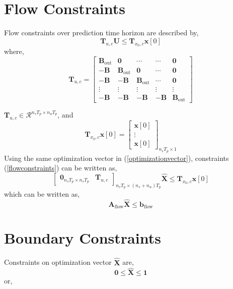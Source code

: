 \documentclass{article}
\begin{document}
\section{Flow Constraints}
Flow constraints over prediction time horizon are described by,
\begin{equation}
\label{flowconstraints}
\mathbf{T}_{u,c} \mathbf{U} \leq \mathbf{T}_{x_0,c} \mathbf{x}[0]
\end{equation}
where,
\[
\mathbf{T}_{u,c} =
\begin{bmatrix}
\mathbf{B}_{\text{out}} & \mathbf{0} & \cdots & \cdots & \mathbf{0}\\
- \mathbf{B} & \mathbf{B}_{\text{out}} & \mathbf{0} & \cdots & \mathbf{0}\\
- \mathbf{B} & -\mathbf{B} & \mathbf{B}_{\text{out}} & \cdots & \mathbf{0}\\
\vdots & \vdots & \vdots & \vdots & \vdots\\
- \mathbf{B} & - \mathbf{B} & - \mathbf{B} & - \mathbf{B} & \mathbf{B}_{\text{out}}

\end{bmatrix}
\]

$\mathbf{T}_{u,c} \in \mathcal{R}^{n_s T_p \times n_u T_p}$, and 
\[
\mathbf{T}_{x_0,c} \mathbf{x}[0] =
\begin{bmatrix}
\mathbf{x}[0]\\
\vdots \\
\mathbf{x}[0]
\end{bmatrix}_{n_s T_p \times 1}
\]
Using the same optimization vector in (\ref{optimizationvector}), constraints (\ref{flowconstraints}) can be written as,
\begin{equation}
\label{compactflowconstraints}
\begin{bmatrix}
\mathbf{0}_{n_s T_p \times n_s T_p} & \mathbf{T}_{u,c}
\end{bmatrix}_{n_s T_p \times (n_s+n_u)T_p}
\hat{\mathbf{X}} \leq  \mathbf{T}_{x_0,c} \mathbf{x}[0]
\end{equation}
which can be written as,
\[
\mathbf{A}_{\text{flow}} \hat{\mathbf{X}} \leq \mathbf{b}_{\text{flow}}
\]

\section{Boundary Constraints}
Constraints on optimization vector $\hat{\mathbf{X}}$ are,
\begin{equation}
\label{boxConstraints}
\mathbf{0} \leq \hat{\mathbf{X}} \leq \mathbf{1}
\end{equation}
or,
\end{document}
